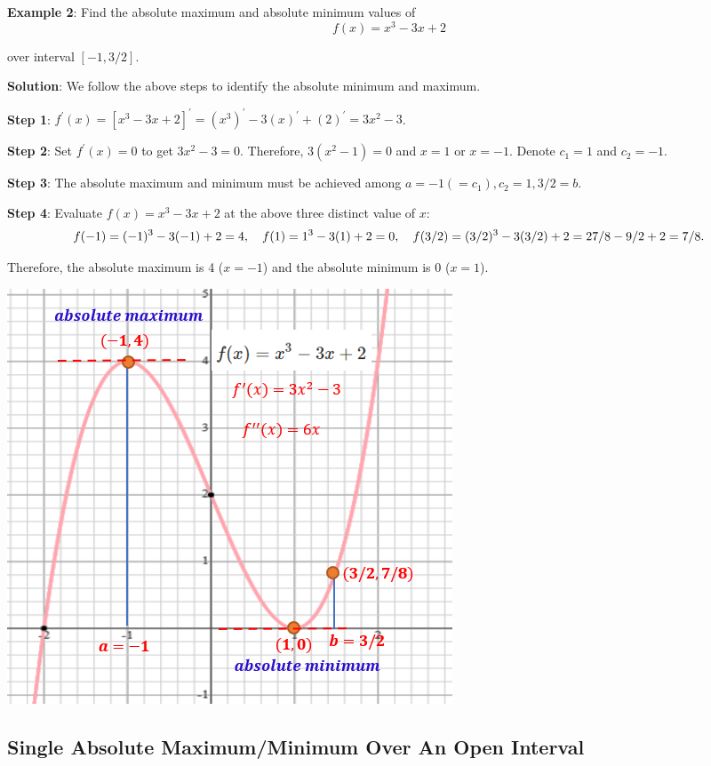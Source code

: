 \documentclass[
]{book}
\begin{document}
\hfill\break

\textbf{Example 2}: Find the absolute maximum and absolute minimum values of
\[
f(x) = x^3 - 3x + 2
\]

over interval \([-1, 3/2]\).

\textbf{Solution}: We follow the above steps to identify the absolute minimum and maximum.

\textbf{Step 1}: \(f^\prime(x) = [x^3 - 3x + 2]^\prime = (x^3)^\prime - 3(x)^\prime + (2)^\prime = 3x^2 - 3\).

\textbf{Step 2}: Set \(f^\prime(x) = 0\) to get \(3x^2 - 3 = 0\). Therefore, \(3(x^2 -1)= 0\) and \(x = 1\) or \(x = -1\). Denote \(c_1 = 1\) and \(c_2 = -1\).

\textbf{Step 3}: The absolute maximum and minimum must be achieved among \(a = -1( = c_1), c_2 = 1, 3/2 = b\).

\textbf{Step 4}: Evaluate \(f(x) = x^3 - 3x + 2\) at the above three distinct value of \(x\):
\[
f(-1) = (-1)^3 - 3(-1) + 2 = 4, ~~~ f(1) = 1^3 - 3(1) + 2 = 0,\\
~~~ f(3/2) = (3/2)^3 - 3(3/2) + 2 = 27/8 - 9/2 + 2 = 7/8.
\]

Therefore, the absolute maximum is 4 (\(x = -1\)) and the absolute minimum is 0 (\(x =1\)).

\begin{center}\includegraphics[width=0.5\linewidth]{img09/w09-example02} \end{center}

\hfill\break

\hypertarget{single-absolute-maximumminimum-over-an-open-interval}{%
\subsection{Single Absolute Maximum/Minimum Over An Open Interval}\label{single-absolute-maximumminimum-over-an-open-interval}}
\end{document}
